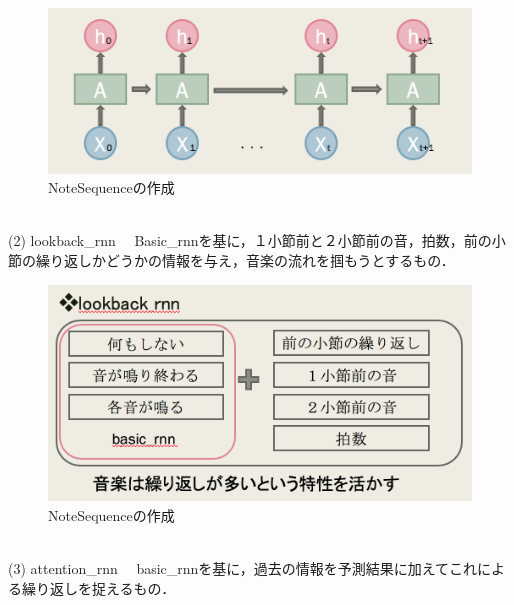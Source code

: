 \begin{figure}[!ht]
    \begin{screen}
    \begin{center}
        \includegraphics[scale=0.8, clip]{./img/basic4.png}
        \caption{NoteSequenceの作成}
        \label{fig:NoteSequenceの作成}
    \end{center}
    \end{screen}
\end{figure}\\
(2) lookback\_rnn
　Basic\_rnnを基に，１小節前と２小節前の音，拍数，前の小節の繰り返しかどうかの情報を与え，音楽の流れを掴もうとするもの．\\
\newpage
\begin{figure}[!ht]
    \begin{screen}
    \begin{center}
        \includegraphics[scale=0.8, clip]{./img/lookback1.png}
        \caption{NoteSequenceの作成}
        \label{fig:NoteSequenceの作成}
    \end{center}
    \end{screen}
\end{figure}\\
(3) attention\_rnn
　basic\_rnnを基に，過去の情報を予測結果に加えてこれによる繰り返しを捉えるもの．\\
